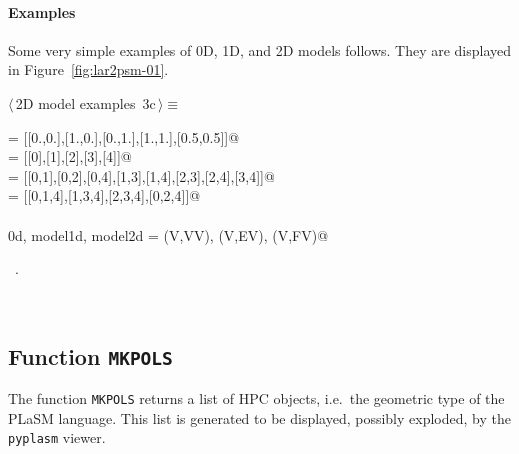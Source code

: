 \documentclass[11pt,oneside]{article}	%
\begin{document}
\paragraph{Examples} 
Some very simple examples of 0D, 1D, and 2D models follows. They are displayed in Figure~\ref{fig:lar2psm-01}.
\begin{flushleft} \small
\begin{minipage}{\linewidth} \label{scrap7}
\protect{}$\langle\,$2D model examples\nobreak\ {\footnotesize 3c}$\,\rangle\equiv$
\vspace{-1ex}
\begin{list}{}{} \item
\mbox{}\verb@V = [[0.,0.],[1.,0.],[0.,1.],[1.,1.],[0.5,0.5]]@\\
\mbox{}\verb@VV = [[0],[1],[2],[3],[4]]@\\
\mbox{}\verb@EV = [[0,1],[0,2],[0,4],[1,3],[1,4],[2,3],[2,4],[3,4]]@\\
\mbox{}\verb@FV = [[0,1,4],[1,3,4],[2,3,4],[0,2,4]]@\\
\mbox{}\verb@@\\
\mbox{}\verb@model0d, model1d, model2d = (V,VV), (V,EV), (V,FV)@\\
\mbox{}\verb@@{\NWsep}
\end{list}
\vspace{-1ex}
\footnotesize\addtolength{\baselineskip}{-1ex}
\begin{list}{}{\setlength{\itemsep}{-\parsep}\setlength{\itemindent}{-\leftmargin}}
\item \NWtxtMacroRefIn\ .
\end{list}
\end{minipage}\\[4ex]
\end{flushleft}

\subsection{Function \texttt{MKPOLS}}

The function \texttt{MKPOLS} returns a list of HPC objects, i.e.~the geometric type of the PLaSM language. This list is generated to be displayed, possibly exploded, by the \texttt{pyplasm} viewer. 
\end{document}
